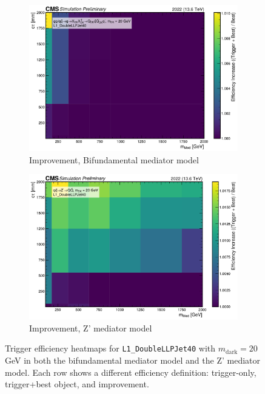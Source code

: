 \begin{figure}[h]
  \vspace{1em}

  \begin{subfigure}[t]{0.45\textwidth}
    \centering
    \includegraphics[width=\linewidth]{images/L1/llp_2D_tchan/trigeffplots2D_L1_efftype-improv_t-channel_mDark-20_L1_DoubleLLPJet40_study_cloppear.pdf}
    \caption{Improvement, Bifundamental mediator model}
    \label{fig:doublellp_improv_tchan}
  \end{subfigure}
  \hfill
  \begin{subfigure}[t]{0.45\textwidth}
    \centering
    \includegraphics[width=\linewidth]{images/L1/llp_2D_schan/trigeffplots2D_L1_efftype-improv_s-channel_mDark-20_L1_DoubleLLPJet40_study_cloppear.pdf}
    \caption{Improvement, Z' mediator model}
    \label{fig:doublellp_improv_schan}
  \end{subfigure}

  \caption{Trigger efficiency heatmaps for \texttt{L1\_DoubleLLPJet40} with $m_\mathrm{dark} = 20$ GeV in both the bifundamental mediator model and the Z' mediator model. Each row shows a different efficiency definition: trigger-only, trigger+best object, and improvement.}
  \label{fig:doublellp_eff}
\end{figure}


